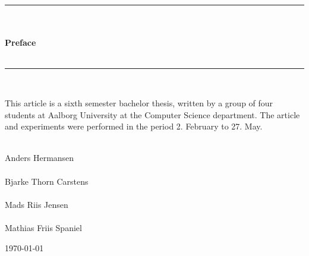\begin{center}

\rule{\textwidth}{3pt}\\
\hrulefill\\
{ \huge \bfseries Preface} \\
\hrulefill\\
\rule{\textwidth}{3pt}\\
\end{center}

This article is a sixth semester bachelor thesis, written by a group of four students at Aalborg University at the Computer Science department. The article and experiments were performed in the period 2. February to 27. May.  

\begin{center}
\begin{minipage}{6cm}
\makebox[5cm]{}
\makebox[5cm]{}
\makebox[5cm]{\hrulefill}\\
Anders Hermansen\\
\makebox[5cm]{}
\makebox[5cm]{}
\makebox[5cm]{\hrulefill}\\
Bjarke Thorn Carstens\\
\makebox[5cm]{}
\makebox[5cm]{}
\makebox[5cm]{\hrulefill}\\
Mads Riis Jensen\\
\makebox[5cm]{}
\makebox[5cm]{}
\makebox[5cm]{\hrulefill}\\
Mathias Friis Spaniel \\
\end{minipage}
\end{center}
\vfill
{\large \today}
